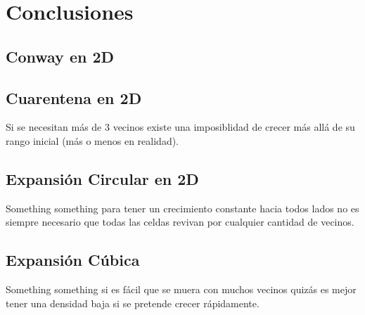 \section{Conclusiones}\label{sec:conclusiones}

\subsection{Conway en 2D}\label{subsec:conway-en-2d-conc}

\subsection{Cuarentena en 2D}\label{subsec:cuarentena-2D-conc}

Si se necesitan más de 3 vecinos existe una imposiblidad de crecer más allá de su rango inicial (más o menos en realidad).

\subsection{Expansión Circular en 2D}\label{subsec:expansion-circular-2D-conc}

Something something para tener un crecimiento constante hacia todos lados no es siempre necesario que todas las celdas revivan por cualquier
cantidad de vecinos.

\subsection{Expansión Cúbica}\label{subsec:cubito-3D-conc}

Something something si es fácil que se muera con muchos vecinos quizás es mejor tener una densidad baja si se pretende crecer rápidamente.
